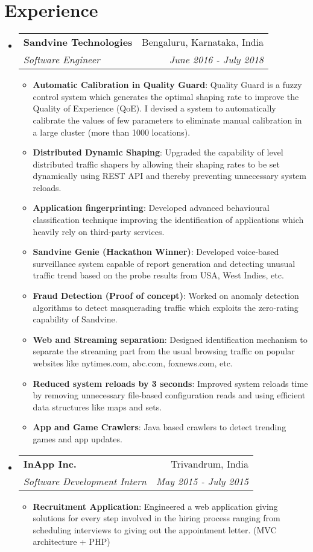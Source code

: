 \documentclass[letterpaper,12pt]{article}
\makeatletter
\newcommand{\resumeItem}[2]{
  \item\small{
    \textbf{#1}{: #2 \vspace{-2pt}}
  }
}
\newcommand{\resumeSubheading}[4]{
  \vspace{-1pt}\item
    \begin{tabular*}{0.97\textwidth}{l@{\extracolsep{\fill}}r}
      \textbf{#1} & #2 \\
      \textit{\small#3} & \textit{\small #4} \\
    \end{tabular*}\vspace{-5pt}
}
\newcommand{\resumeSubHeadingListStart}{\begin{itemize}[leftmargin=*]}
\newcommand{\resumeSubHeadingListEnd}{\end{itemize}}
\newcommand{\resumeItemListStart}{\begin{itemize}}
\newcommand{\resumeItemListEnd}{\end{itemize}\vspace{-5pt}}
\makeatother
\begin{document}
\section{Experience}
  \resumeSubHeadingListStart

    \resumeSubheading
      {Sandvine Technologies}{Bengaluru, Karnataka, India}
      {Software Engineer}{June 2016 - July 2018}
      \resumeItemListStart
        \resumeItem{Automatic Calibration in Quality Guard}
          {Quality Guard is a fuzzy control system which generates the optimal shaping rate to improve the Quality of Experience (QoE). I devised a system to automatically calibrate the values of few parameters to eliminate manual calibration in a large cluster (more than 1000 locations).}  
        \resumeItem{Distributed Dynamic Shaping}
          {Upgraded the capability of level distributed traffic shapers by allowing their shaping rates to be set dynamically using REST API and thereby preventing unnecessary system reloads.}  
        \resumeItem{Application fingerprinting}
          {Developed advanced behavioural classification technique improving the identification of applications which heavily rely on third-party services.}
        \resumeItem{Sandvine Genie (Hackathon Winner)}
          {Developed voice-based surveillance system capable of report generation and detecting unusual traffic trend based on the probe results from USA, West Indies, etc.}
        \resumeItem{Fraud Detection (Proof of concept)}
          {Worked on anomaly detection algorithms to detect masquerading traffic which exploits the zero-rating capability of Sandvine.}
        \resumeItem{Web and Streaming separation}
          {Designed identification mechanism to separate the streaming part from the usual browsing traffic on popular websites like nytimes.com, abc.com, foxnews.com, etc. }
          \resumeItem{Reduced system reloads by 3 seconds}
          {Improved system reloads time by removing unnecessary file-based configuration reads and using efficient data structures like maps and sets.}
        \iffalse  
        \resumeItem{Network Forensics using Machine Learning}
          {Project to detect Malware inside TCP packet based on their
          anomalous characteristics. The TCP header fields are used as datasets to implement the machine learning model.}
        \fi  
        \resumeItem{App and Game Crawlers}
          {Java based crawlers to detect trending games and app updates. }
        
      \resumeItemListEnd

    \resumeSubheading
      {InApp Inc.}{Trivandrum, India}
      {Software Development Intern}{May 2015 - July 2015}
      \resumeItemListStart
        \resumeItem{Recruitment Application}
          {Engineered a web application giving solutions for every step involved in the hiring process ranging from scheduling interviews to giving out the appointment letter. (MVC architecture + PHP)  }
      \resumeItemListEnd
  \resumeSubHeadingListEnd
\end{document}
